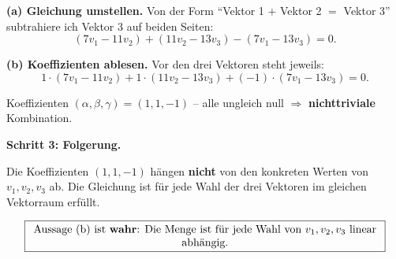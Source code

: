 \documentclass[a4paper,12pt]{article}
\begin{document}
\textbf{(a) Gleichung umstellen.} Von der Form ``Vektor 1 $+$ Vektor 2 $=$ Vektor 3'' subtrahiere ich Vektor 3 auf beiden Seiten:
\[
(7v_1 - 11v_2) + (11v_2 - 13v_3) - (7v_1 - 13v_3) = 0.
\]

\textbf{(b) Koeffizienten ablesen.} Vor den drei Vektoren steht jeweils:
\[
1 \cdot (7v_1 - 11v_2) + 1 \cdot (11v_2 - 13v_3) + (-1) \cdot (7v_1 - 13v_3) = 0.
\]

Koeffizienten $(\alpha, \beta, \gamma) = (1, 1, -1)$ -- alle ungleich null $\Rightarrow$ \textbf{nichttriviale} Kombination.

\medskip

\textbf{Schritt 3: Folgerung.}

Die Koeffizienten $(1, 1, -1)$ h\"angen \textbf{nicht} von den konkreten Werten von $v_1, v_2, v_3$ ab.
Die Gleichung ist f\"ur jede Wahl der drei Vektoren im gleichen Vektorraum erf\"ullt.

\[
\fbox{\parbox{0.93\textwidth}{\centering
Aussage (b) ist \textbf{wahr}: Die Menge ist f\"ur jede Wahl von $v_1, v_2, v_3$ linear abh\"angig.
}}
\]
\end{document}
